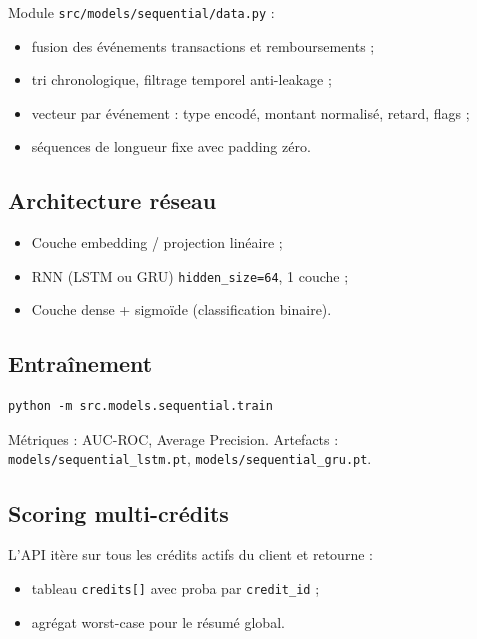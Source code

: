 Module \texttt{src/models/sequential/data.py} :
\begin{itemize}[leftmargin=*]
  \item fusion des événements transactions et remboursements ;
  \item tri chronologique, filtrage temporel anti-leakage ;
  \item vecteur par événement : type encodé, montant normalisé, retard, flags ;
  \item séquences de longueur fixe avec padding zéro.
\end{itemize}

\subsection{Architecture réseau}

\begin{itemize}[leftmargin=*]
  \item Couche embedding / projection linéaire ;
  \item RNN (LSTM ou GRU) \texttt{hidden\_size=64}, 1 couche ;
  \item Couche dense + sigmoïde (classification binaire).
\end{itemize}

\subsection{Entraînement}

\begin{lstlisting}[caption={Commande d'entraînement séquentiel}]
python -m src.models.sequential.train
\end{lstlisting}

Métriques : AUC-ROC, Average Precision. Artefacts : \texttt{models/sequential\_lstm.pt}, \texttt{models/sequential\_gru.pt}.

\subsection{Scoring multi-crédits}

L'API  itère sur tous les crédits actifs du client et retourne :
\begin{itemize}[leftmargin=*]
  \item tableau \texttt{credits[]} avec proba par \texttt{credit\_id} ;
  \item agrégat worst-case pour le résumé global.
\end{itemize}

